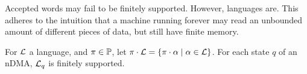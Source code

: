 \noindent Accepted words may fail to be finitely supported. However, languages are. This adheres to the intuition that a machine running forever may read an unbounded amount of different pieces of data, but still have finite memory.

\begin{theorem}\label{thm:languages-finitely-supported}
 For $\mathcal{L}$ a language, and $\pi\in \mathbb{P}$, let $\pi\cdot \mathcal{L} = \{\pi \cdot \alpha \mid \alpha \in \mathcal{L}\}$. For each state $q$ of an nDMA, $\mathcal{L}_{q}$ is finitely supported.
\end{theorem}

